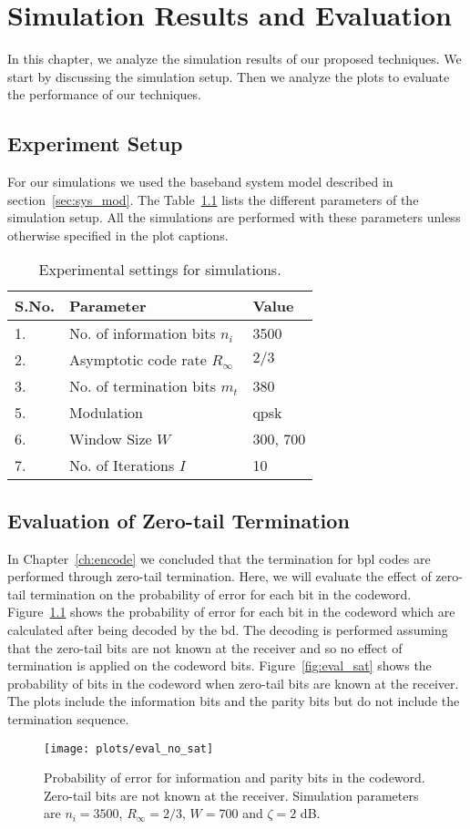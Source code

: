 \chapter{Simulation Results and Evaluation}\label{ch:simulation}
In this chapter, we analyze the simulation results of our proposed techniques. We start by discussing the simulation setup. Then we analyze the plots to evaluate the performance of our techniques.

\section{Experiment Setup}
For our simulations we used the baseband system model described in section~\ref{sec:sys_mod}. The Table~\ref{tab:sim_param} lists the different parameters of the simulation setup. All the simulations are performed with these parameters unless otherwise specified in the plot captions.
\begin{table}[htbp]
\centering
\begin{tabular}{|l|l|l|}
  \hline
  \textbf{S.No.} &\textbf{Parameter} &\textbf{Value}\\
  \hline
  \hline
  1. &No. of information bits $n_i$ &3500\\
  \hline
  2. &Asymptotic code rate $R_\infty$ &$2/3$\\
  \hline
  3. &No. of termination bits $m_t$ &380\\
  \hline
  5. &Modulation &\gls{qpsk}\\
  \hline
  6. &Window Size $W$ &300, 700\\
  \hline
  7. &No. of Iterations $I$ &10\\
  \hline
\end{tabular}
\caption{Experimental settings for simulations.}
\label{tab:sim_param}
\end{table}

\section{Evaluation of Zero-tail Termination}
In Chapter~\ref{ch:encode} we concluded that the termination for \gls{bpl} codes are performed through zero-tail termination. Here, we will evaluate the effect of zero-tail termination on the probability of error for each bit in the codeword. Figure~\ref{fig:eval_no_sat} shows the probability of error for each bit in the codeword which are calculated after being decoded by the \gls{bd}. The decoding is performed assuming that the zero-tail bits are not known at the receiver and so no effect of termination is applied on the codeword bits. Figure~\ref{fig:eval_sat} shows the probability of bits in the codeword when zero-tail bits are known at the receiver. The plots include the information bits and the parity bits but do not include the termination sequence.
\begin{figure}[htbp]
  \centering
  \texttt{[image: plots/eval\_no\_sat]}
  \caption{Probability of error for information and parity bits in the codeword. Zero-tail bits are not known at the receiver. Simulation parameters are $n_i=3500$, $R_\infty=2/3$, $W=700$ and $\zeta=2$ dB.}
  \label{fig:eval_no_sat}
\end{figure}

